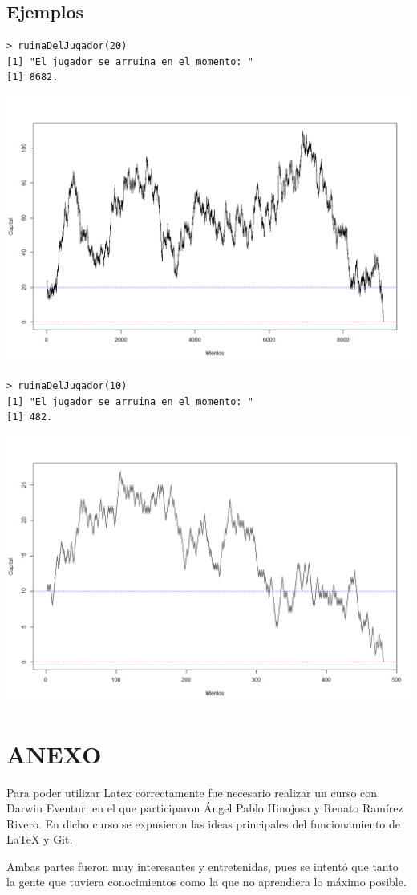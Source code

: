 \documentclass[10pt,a4paper]{article}
\begin{document}
\subsection{Ejemplos}
\begin{verbatim}
> ruinaDelJugador(20)
[1] "El jugador se arruina en el momento: "
[1] 8682.
\end{verbatim}
\begin{center}
\includegraphics[scale=0.35]{Jugador20_1.png} 
\end{center}

\begin{verbatim}
> ruinaDelJugador(10)
[1] "El jugador se arruina en el momento: "
[1] 482.
\end{verbatim}
\begin{center}
\includegraphics[scale=0.35]{Jugador10_1.png} 
\end{center}

\newpage
\section{ANEXO}
Para poder utilizar Latex\cite{LaTeX} correctamente fue necesario realizar un curso con Darwin Eventur, en el que participaron Ángel Pablo Hinojosa y Renato Ramírez Rivero. En dicho curso se expusieron las ideas principales del funcionamiento de LaTeX y Git.

Ambas partes fueron muy interesantes y entretenidas, pues se intentó que tanto la gente que tuviera conocimientos como la que no aprendiera lo máximo posible.
\newpage


\end{document}
